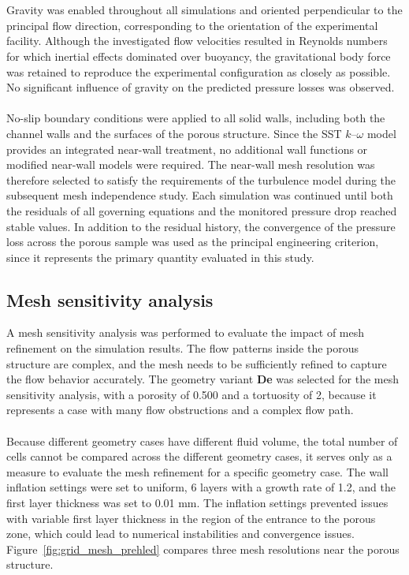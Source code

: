 \documentclass[a4paper]{article}
\begin{document}
\\
\\
Gravity was enabled throughout all simulations and oriented perpendicular to the principal flow direction, corresponding to the orientation of the experimental facility. Although the investigated flow velocities resulted in Reynolds numbers for which inertial effects dominated over buoyancy, the gravitational body force was retained to reproduce the experimental configuration as closely as possible. No significant influence of gravity on the predicted pressure losses was observed.
\\
\\
No-slip boundary conditions were applied to all solid walls, including both the channel walls and the surfaces of the porous structure. Since the SST $k$--$\omega$ model provides an integrated near-wall treatment, no additional wall functions or modified near-wall models were required. The near-wall mesh resolution was therefore selected to satisfy the requirements of the turbulence model during the subsequent mesh independence study.
Each simulation was continued until both the residuals of all governing equations and the monitored pressure drop reached stable values. In addition to the residual history, the convergence of the pressure loss across the porous sample was used as the principal engineering criterion, since it represents the primary quantity evaluated in this study.



\newpage
\subsection{Mesh sensitivity analysis}
A mesh sensitivity analysis was performed to evaluate the impact of mesh refinement on the simulation results. 
The flow patterns inside the porous structure are complex, and the mesh needs to be sufficiently refined to capture the flow behavior accurately.
The geometry variant \textbf{De} was selected for the mesh sensitivity analysis, with a porosity of 0.500 and a tortuosity of 2, because it represents a case with many flow obstructions and a complex flow path.
\\
\\
Because different geometry cases have different fluid volume, the total number of cells cannot be compared across the different geometry cases, it serves only as a measure to evaluate the mesh refinement for a specific geometry case.
The wall inflation settings were set to uniform, 6 layers with a growth rate of 1.2, and the first layer thickness was set to 0.01 mm.
The inflation settings prevented issues with variable first layer thickness in the region of the entrance to the porous zone, which could lead to numerical instabilities and convergence issues.
Figure~\ref{fig:grid_mesh_prehled} compares three mesh resolutions near the porous structure.
\end{document}
